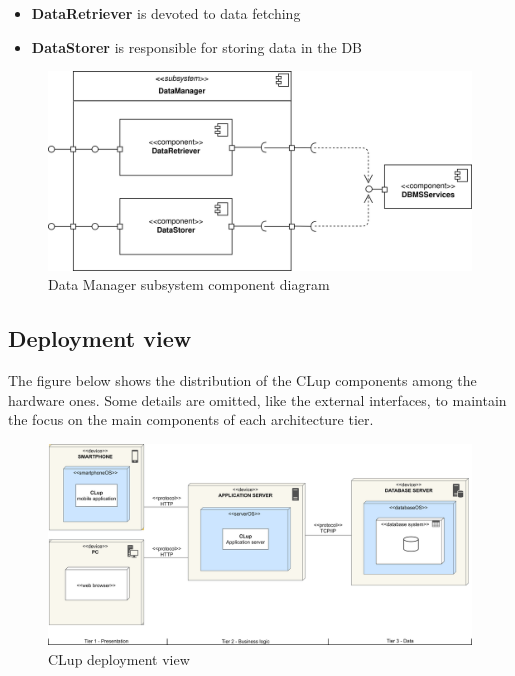 \documentclass[]{article}
\begin{document}
		\begin{itemize}
		
			\item \textbf{DataRetriever} is devoted to data fetching
			\item \textbf{DataStorer} is responsible for storing data in the DB
		\end{itemize}
		
			\begin{figure}[H]
			\centering
			\includegraphics[scale=0.9]{ComponentView/DataManagerComponent.png}
			\caption{Data Manager subsystem component diagram}
			\label{fig:DataManagerDiagram}
		\end{figure}
	
		
	
	
	
	\newpage
	\subsection{Deployment view}
	The figure below shows the distribution of the CLup components among the hardware ones. Some details are omitted, like the external interfaces, to maintain the focus on the main components of each architecture tier. 
	\newline
	\begin{figure}[H]
		\centering
		\includegraphics[scale=0.38]{deployment}
		\caption{CLup deployment view}
		\label{fig:deployment}
	\end{figure}
\end{document}

